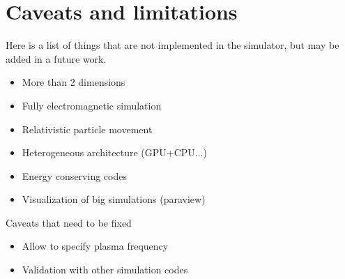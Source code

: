 \chapter{Caveats and limitations}

Here is a list of things that are not implemented in the simulator, but may be 
added in a future work.

\begin{itemize}
\item More than 2 dimensions
\item Fully electromagnetic simulation
\item Relativistic particle movement
\item Heterogeneous architecture (GPU+CPU...)
\item Energy conserving codes
\item Visualization of big simulations (paraview)
\end{itemize}
%
Caveats that need to be fixed
%
\begin{itemize}
\item Allow to specify plasma frequency
\item Validation with other simulation codes
\end{itemize}
